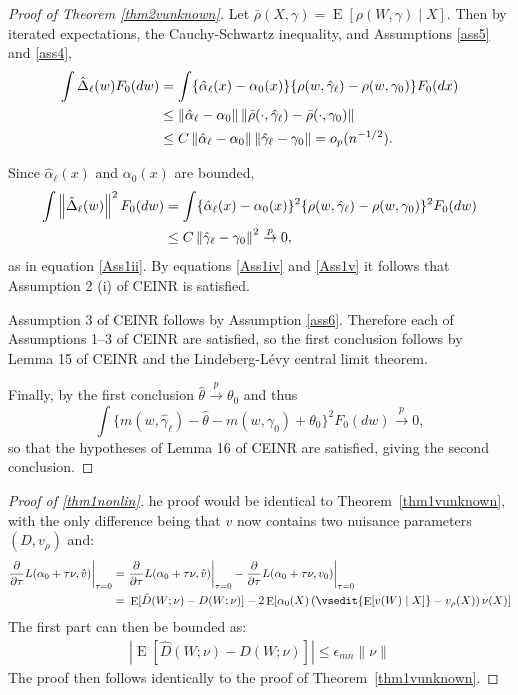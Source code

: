 \documentclass[aos]{imsart}
\numberwithin{equation}{section}
\theoremstyle{plain}
\theoremstyle{remark}
\DeclareMathOperator{\E}{E}
\begin{document}
\begin{appendix}
\begin{proof}[Proof of Theorem \ref{thm2vunknown}]
Let $\bar{\rho}(X,\gamma)=\E[\rho(W,\gamma)\mid X].$ Then by iterated expectations,
the Cauchy-Schwartz inequality, and Assumptions \ref{ass5} and \ref{ass4},
\begin{align}
\int\hat{\Delta}_{\ell}(w)F_{0}(dw)  &  =\int\{\hat{\alpha}_{\ell}(x)-\alpha_{0}(x)\}\{\rho(w, \hat{\gamma}_{\ell})-\rho(w,\gamma_{0})\} F_{0}(dx) \notag \\
& \leq \left\Vert \hat{\alpha}_{\ell}-\alpha_{0}\right\Vert \left\Vert
\bar\rho(\cdot, \hat{\gamma}_{\ell})-\bar\rho(\cdot,\gamma_{0})\right\Vert \notag \\
&  \leq C \left\Vert \hat{\alpha}_{\ell}-\alpha_{0}\right\Vert \left\Vert
\hat{\gamma}_{\ell}-\gamma_{0}\right\Vert = o_{p}(n^{-1/2}). \label{Ass1iv}
\end{align}

Since $\hat{\alpha}_\ell(x)$ and $\alpha_{0}(x)$ are bounded,%
\begin{align}
\int\left\Vert \hat{\Delta}_{\ell}(w)\right\Vert ^{2}F_{0}(dw)  &  =\int%
\{\hat{\alpha}_{\ell}(x)-\alpha_{0}(x)\}^2\{\rho(w, \hat{\gamma}_{\ell})-\rho(w,\gamma_{0})\}^2F_{0}(dw) \notag \\
&  \leq C \left\Vert
\hat{\gamma}_{\ell}-\gamma_{0}\right\Vert^{2} \overset{p}{\to}0, \label{Ass1v}
\end{align}
as in equation \eqref{Ass1ii}. By equations \eqref{Ass1iv} and \eqref{Ass1v} it follows that Assumption 2 (i) of CEINR is satisfied.

Assumption 3 of CEINR follows by Assumption \ref{ass6}. Therefore each of
Assumptions 1--3 of CEINR are satisfied, so the first conclusion follows by
Lemma 15 of CEINR and the Lindeberg-Lévy central limit theorem.

Finally, by the first conclusion $\hat{\theta}\overset{p}{\to}\theta_{0}$ and thus \[\int\{m(w,\hat{\gamma}_{\ell})-\hat{\theta}%
-m(w,\gamma_{0})+\theta_0\}^{2}F_{0}(dw)\overset{p}{\to}0,\] so that the hypotheses of Lemma 16 of CEINR are satisfied, giving the second conclusion. 
\end{proof}

\begin{proof}[Proof of \ref{thm1nonlin}]
he proof would be identical to Theorem~\ref{thm1vunknown}, with the only difference being that $v$ now contains two nuisance parameters $(D, v_\rho)$ and:
\begin{align*}
     \frac{\partial}{\partial \tau} L(\alpha_0 + \tau\nu, \hat{v})\bigg|_{\tau=0} =~& \frac{\partial}{\partial \tau} L(\alpha_0 + \tau\nu, \hat{v})\bigg|_{\tau=0} - \frac{\partial}{\partial \tau} L(\alpha_0 + \tau\nu, v_0)\bigg|_{\tau=0}\\
     =~& \E[\hat{D}(W;\nu) - D(W;\nu)]-2 \E[\alpha_0(X)\, (\vsedit{\E[v(W)\mid X]}- v_\rho(X))\, \nu(X)]
\end{align*}
The first part can then be bounded as:
\begin{align*}
    |\E[\hat{D}(W;\nu) - D(W;\nu)]| \leq \epsilon_{mn} \|\nu\|
\end{align*}
The proof then follows identically to the proof of Theorem~\ref{thm1vunknown}.
\end{proof}


\end{appendix}
\end{document}
